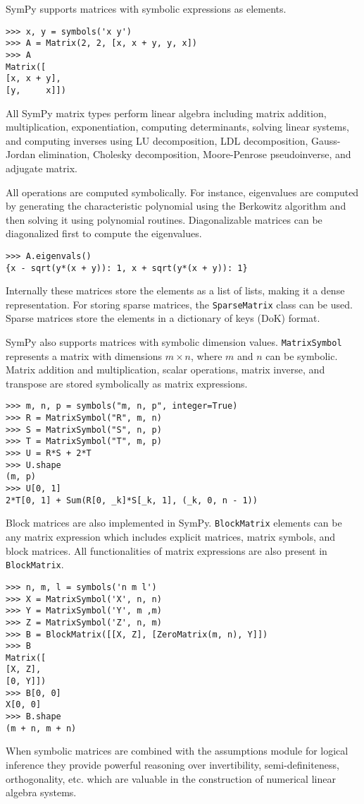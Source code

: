 SymPy supports matrices with symbolic expressions as elements.

\begin{verbatim}
>>> x, y = symbols('x y')
>>> A = Matrix(2, 2, [x, x + y, y, x])
>>> A
Matrix([
[x, x + y],
[y,     x]])
\end{verbatim}

All SymPy matrix types perform linear algebra including matrix addition,
multiplication, exponentiation, computing determinants, solving linear systems,
and computing inverses using LU decomposition, LDL decomposition, Gauss-Jordan
elimination, Cholesky decomposition, Moore-Penrose pseudoinverse, and adjugate
matrix.

All operations are computed symbolically. For instance, eigenvalues are computed
by generating the characteristic polynomial using the Berkowitz algorithm and
then solving it using polynomial routines. Diagonalizable matrices can be
diagonalized first to compute the eigenvalues.

\begin{verbatim}
>>> A.eigenvals()
{x - sqrt(y*(x + y)): 1, x + sqrt(y*(x + y)): 1}
\end{verbatim}

Internally these matrices store the elements as a list of lists, making it a dense
representation. For storing sparse matrices, the \verb|SparseMatrix| class can
be used. Sparse matrices store the elements in a dictionary of keys (DoK)
format.

SymPy also supports matrices with symbolic dimension values. \verb|MatrixSymbol|
represents a matrix with dimensions $m\times n$, where $m$ and $n$ can be
symbolic. Matrix addition and multiplication, scalar operations, matrix inverse,
and transpose are stored symbolically as matrix expressions.

\begin{verbatim}
>>> m, n, p = symbols("m, n, p", integer=True)
>>> R = MatrixSymbol("R", m, n)
>>> S = MatrixSymbol("S", n, p)
>>> T = MatrixSymbol("T", m, p)
>>> U = R*S + 2*T
>>> U.shape
(m, p)
>>> U[0, 1]
2*T[0, 1] + Sum(R[0, _k]*S[_k, 1], (_k, 0, n - 1))
\end{verbatim}

Block matrices are also implemented in SymPy. \verb|BlockMatrix| elements can be any
matrix expression which includes explicit matrices, matrix symbols, and block
matrices. All functionalities of matrix expressions are also present in
\verb|BlockMatrix|.

\begin{verbatim}
>>> n, m, l = symbols('n m l')
>>> X = MatrixSymbol('X', n, n)
>>> Y = MatrixSymbol('Y', m ,m)
>>> Z = MatrixSymbol('Z', n, m)
>>> B = BlockMatrix([[X, Z], [ZeroMatrix(m, n), Y]])
>>> B
Matrix([
[X, Z],
[0, Y]])
>>> B[0, 0]
X[0, 0]
>>> B.shape
(m + n, m + n)
\end{verbatim}

When symbolic matrices are combined with the assumptions module for logical
inference they provide powerful reasoning over invertibility,
semi-definiteness, orthogonality, etc. which are valuable in the construction
of numerical linear algebra systems.
